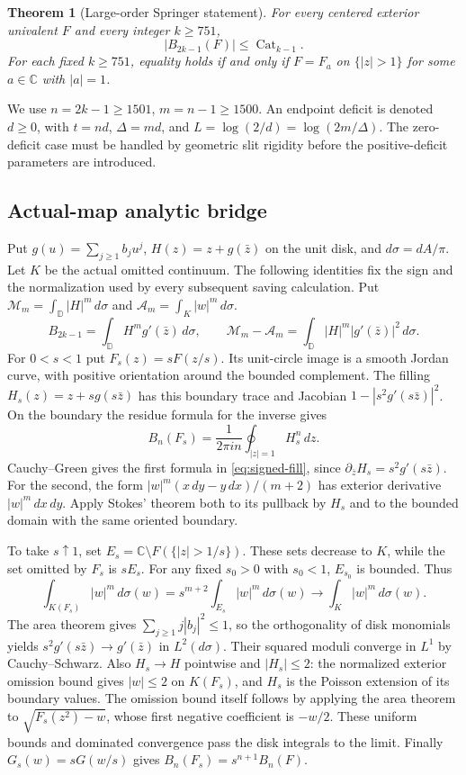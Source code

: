 \documentclass[11pt]{article}
\newtheorem{theorem}{Theorem}
\newcommand{\D}{\mathbb D}
\newcommand{\C}{\mathbb C}
\newcommand{\Cat}{\operatorname{Cat}}
\begin{document}
	\begin{theorem}[Large-order Springer statement]\label{thm:large}
		For every centered exterior univalent $F$ and every integer $k\geq751$,
		\[
		|B_{2k-1}(F)|\leq\Cat_{k-1}.
		\]
		For each fixed $k\geq751$, equality holds if and only if
		$F=F_a$ on $\{|z|>1\}$ for some $a\in\C$ with $|a|=1$.
	\end{theorem}
	
	We use $n=2k-1\geq1501$, $m=n-1\geq1500$.  An endpoint deficit is denoted
	$d\geq0$, with $t=nd$, $\Delta=md$, and
	$L=\log(2/d)=\log(2m/\Delta)$.  The zero-deficit case must be handled
	by geometric slit rigidity before the positive-deficit parameters are
	introduced.
	
	\subsection{Actual-map analytic bridge}\label{sec:bridge}
	Put $g(u)=\sum_{j\geq1}b_ju^j$, $H(z)=z+g(\bar z)$ on the unit disk,
	and $d\sigma=dA/\pi$.  Let $K$ be the actual omitted continuum.
	The following identities fix the sign and the normalization used by
	every subsequent saving calculation.  Put
	$\mathcal M_m=\int_{\D}|H|^m\,d\sigma$ and
	$\mathcal A_m=\int_K|w|^m\,d\sigma$.
	\begin{equation}\label{eq:signed-fill}
		B_{2k-1}=\int_{\D}H^mg'(\bar z)\,d\sigma,
		\qquad \mathcal M_m-\mathcal A_m
		=\int_{\D}|H|^m|g'(\bar z)|^2\,d\sigma.
	\end{equation}
	For $0<s<1$ put $F_s(z)=sF(z/s)$. Its unit-circle image is a
	smooth Jordan curve, with positive orientation around the bounded
	complement. The filling $H_s(z)=z+s g(s\bar z)$ has this boundary
	trace and Jacobian $1-|s^2 g'(s\bar z)|^2$. On the boundary the
	residue formula for the inverse gives
	\[
	B_n(F_s)=\frac{1}{2\pi i n}\oint_{|z|=1}H_s^n\,dz .
	\]
	Cauchy--Green gives the first formula in \eqref{eq:signed-fill},
	since $\partial_{\bar z}H_s=s^2g'(s\bar z)$. For the second, the form
	$|w|^m(x\,dy-y\,dx)/(m+2)$ has exterior derivative $|w|^m\,dx\,dy$.
	Apply Stokes' theorem both to its pullback by $H_s$ and to the
	bounded domain with the same oriented boundary.
	
	To take $s\uparrow1$, set $E_s=\C\setminus F(\{|z|>1/s\})$.
	These sets decrease to $K$, while the set omitted by $F_s$ is $sE_s$.
	For any fixed $s_0>0$ with $s_0<1$, $E_{s_0}$ is bounded. Thus
	\[
	\int_{K(F_s)} |w|^m\,d\sigma(w)
	=s^{m+2}\int_{E_s}|w|^m\,d\sigma(w)
	\longrightarrow \int_K|w|^m\,d\sigma(w).
	\]
	The area theorem gives $\sum_{j\geq1}j|b_j|^2\leq1$, so the
	orthogonality of disk monomials yields
	$s^2g'(s\bar z)\to g'(\bar z)$ in $L^2(d\sigma)$.
	Their squared moduli converge in $L^1$ by Cauchy--Schwarz.
	Also $H_s\to H$ pointwise and $|H_s|\leq2$: the normalized
	exterior omission bound gives $|w|\leq2$ on $K(F_s)$, and $H_s$
	is the Poisson extension of its boundary values. The omission bound
	itself follows by applying the area theorem to $\sqrt{F_s(z^2)-w}$,
	whose first negative coefficient is $-w/2$. These uniform bounds and
	dominated convergence pass the disk integrals to the limit. Finally
	$G_s(w)=sG(w/s)$ gives $B_n(F_s)=s^{n+1}B_n(F)$.
	
\end{document}
